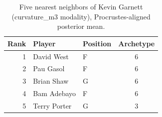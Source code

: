 \begin{table}[htbp]
  \centering\small
  \begin{tabular}{rllc}
    \toprule
    Rank & Player & Position & Archetype \\
    \midrule
    1 & David West & F & 6 \\
    2 & Pau Gasol & F & 6 \\
    3 & Brian Shaw & G & 6 \\
    4 & Bam Adebayo & F & 6 \\
    5 & Terry Porter & G & 3 \\
    \bottomrule
  \end{tabular}
  \caption{Five nearest neighbors of Kevin Garnett (curvature_m3 modality), Procrustes-aligned posterior mean.}
  \label{tab:Kevin_Garnett_neighbors_curvature_m3}
\end{table}

